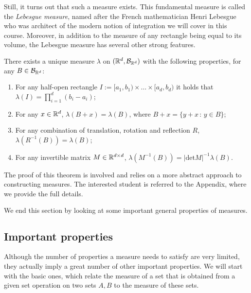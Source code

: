 Still, it turns out that such a measure exists. This fundamental measure is called the \emph{Lebesgue measure}, named after the French mathematician Henri Lebesgue who was architect of the modern notion of integration we will cover in this course. Moreover, in addition to the measure of any rectangle being equal to its volume, the Lebesgue measure has several other strong features.

\begin{theorem}\label{thm:lebesgue_measure}
There exists a unique measure $\lambda$ on $(\mathbb R^d, \mathcal B_{\mathbb R^d})$ with the following properties, for any $B \in \mathcal B_{\mathbb R^d}$:
\begin{enumerate}
\item For any half-open rectangle $I := [a_1, b_1) \times \dots \times [a_d, b_d)$ it holds that $\lambda(I) = \prod_{i = 1}^d (b_i-a_i)$;
\item For any $x \in \mathbb R^d$, $\lambda(B+x) = \lambda(B)$, where $B + x = \{y+x \, : \, y \in B\}$;
\item For any combination of translation, rotation and reflection $R$, $\lambda(R^{-1}(B)) = \lambda(B)$;
\item For any invertible matrix $M \in \mathbb R^{d \times d}$, $\lambda(M^{-1}(B)) = |\mathrm{det} M|^{-1} \lambda(B)$.
\end{enumerate}
\end{theorem}

The proof of this theorem is involved and relies on a more abstract approach to constructing measures. The interested student is referred to the Appendix, where we provide the full details.  

We end this section by looking at some important general properties of measures.


\subsection{Important properties}

Although the number of properties a measure needs to satisfy are very limited, they actually imply a great number of other important properties. We will start with the basic ones, which relate the measure of a set that is obtained from a given set operation on two sets $A, B$ to the measure of these sets.

